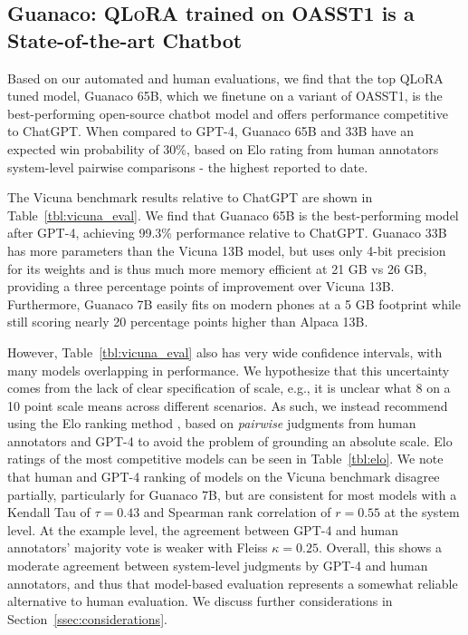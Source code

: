 \subsection{\textbf{Guanaco}: \textsc{QLoRA} trained on OASST1 is a State-of-the-art Chatbot} Based on our automated and human evaluations, we find that the top \textsc{QLoRA} tuned model, {Guanaco} 65B, which we finetune on a variant of OASST1, is the best-performing open-source chatbot model and offers performance competitive to ChatGPT. When compared to GPT-4, {Guanaco} 65B and 33B have an expected win probability of 30\%, based on Elo rating from human annotators system-level pairwise comparisons - the highest reported to date.

The Vicuna benchmark \cite{vicuna2023} results relative to ChatGPT are shown in Table~\ref{tbl:vicuna_eval}. We find that {Guanaco} 65B is the best-performing model after GPT-4, achieving 99.3\% performance relative to ChatGPT. {Guanaco} 33B has more parameters than the Vicuna 13B model, but uses only 4-bit precision for its weights and is thus much more memory efficient at 21 GB vs 26 GB, providing a three percentage points of improvement over Vicuna 13B. Furthermore, {Guanaco} 7B easily fits on modern phones at a 5 GB footprint while still scoring nearly 20 percentage points higher than Alpaca 13B. 

However, Table~\ref{tbl:vicuna_eval} also has very wide confidence intervals, with many models overlapping in performance. We hypothesize that this uncertainty comes from the lack of clear specification of scale, e.g., it is unclear what 8 on a 10 point scale means across different scenarios. As such, we instead recommend using the Elo ranking method \citep{elo1967proposed}, based on \textit{pairwise} judgments from human annotators and GPT-4 to avoid the problem of grounding an absolute scale. Elo ratings of the most competitive models can be seen in Table~\ref{tbl:elo}. We note that human and GPT-4 ranking of models on the Vicuna benchmark disagree partially, particularly for Guanaco 7B, but are consistent for most models with a Kendall Tau of $\tau=0.43$ and Spearman rank correlation of $r=0.55$ at the system level. At the example level, the agreement between GPT-4 and human annotators' majority vote is weaker with Fleiss $\kappa=0.25$. Overall, this shows a moderate agreement between system-level judgments by GPT-4 and human annotators, and thus that model-based evaluation represents a somewhat reliable alternative to human evaluation. We discuss further considerations in Section~\ref{ssec:considerations}.

